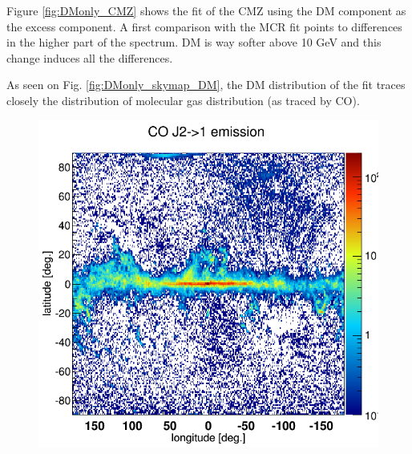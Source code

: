 Figure \ref{fig:DMonly_CMZ} shows the fit of the CMZ using the DM component as the excess component. A first comparison with the MCR fit points to differences in the higher part of the spectrum. DM is way softer above 10 GeV and this change induces all the differences.

As seen on Fig. \ref{fig:DMonly_skymap_DM}, the DM distribution of the fit traces closely the distribution of molecular gas distribution (as traced by CO).


\begin{figure}[H]
  \centering
  \begin{minipage}[h]{0.45\textwidth}
  	\centering
	\includegraphics[width=1.\linewidth]{pic/results/COmap.png}
  	\label{fig:CO_skymap}
  \end{minipage}
  \hfill
  \begin{minipage}[h]{0.45\textwidth}
  	\centering

\end{minipage}
\end{figure}
